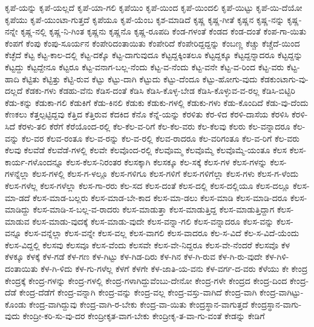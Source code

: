{ಕೃಪೆ-ಯನ್ನು
ಕೃಪೆ-ಯಲ್ಲದೆ
ಕೃಪೆ-ಯಾ-ಗಲಿ
ಕೃಪೆಯಿಂ
ಕೃಪೆ-ಯಿಂದ
ಕೃಪೆ-ಯಿಂದಲಿ
ಕೃಪೆ-ಯಿಟ್ಟು
ಕೃಪೆ-ಯಿ-ದೆಯೋ
ಕೃಪೆಯು
ಕೃಪೆ-ಯುಂಟಾ-ಗುತ್ತದೆ
ಕೃಪೆಯೂ
ಕೃಪೆ-ಯೆಂಬ
ಕೃಶ-ಮಾಡಿದೆ
ಕೃಷ್ಣ
ಕೃಷ್ಣ-ಗೀತೆ
ಕೃಷ್ಣನ
ಕೃಷ್ಣ-ನನ್ನು
ಕೃಷ್ಣ-ನನ್ನೇ
ಕೃಷ್ಣ-ನಲ್ಲಿ
ಕೃಷ್ಣ-ನಿ-ಗಿಂತ
ಕೃಷ್ಣನು
ಕೃಷ್ಣನೊ
ಕೃಷ್ಣ-ರೂಪದಿ
ಕೆಂಡ-ಗಳಂತೆ
ಕೆಂಡದ
ಕೆಂಡ-ದಂತೆ
ಕೆಂಪ-ಗಾ-ಯಿತು
ಕೆಂಪಗೆ
ಕೆಂಪು
ಕೆಂಪು-ಸೂರ್ಯನ
ಕೆಂಪೇರಿದಂತಾಯಿತು
ಕೆಂಪೇರಿದೆ
ಕೆಂಪೇರಿದ್ದದ್ದನ್ನು
ಕೆಂಬಣ್ಣ
ಕೆಚ್ಚು
ಕೆಚ್ಚೆದೆ-ಯಿಂದ
ಕೆಚ್ಛೆದೆ
ಕೆಟ್ಟ
ಕೆಟ್ಟ-ಕಾಲ-ದಲ್ಲಿ
ಕೆಟ್ಟ-ದಕ್ಕೊ
ಕೆಟ್ಟ-ದಾಗುವುದೂ
ಕೆಟ್ಟದ್ದಕ್ಕಿಂತಲೂ
ಕೆಟ್ಟದ್ದಕ್ಕೂ
ಕೆಟ್ಟದ್ದನ್ನಾದರೂ
ಕೆಟ್ಟದ್ದನ್ನು
ಕೆಟ್ಟದ್ದು
ಕೆಟ್ಟದ್ದೇನೂ
ಕೆಟ್ಟರೂ
ಕೆಟ್ಟ-ವನಾಗ-ಬಲ್ಲ-ನೆಂದು
ಕೆಟ್ಟ-ವ-ನೆಂದು
ಕೆಟ್ಟ-ವನೇ
ಕೆಟ್ಟ-ವ-ರಿಂದ
ಕೆಟ್ಟ-ವರು
ಕೆಟ್ಟ-ಹಾದಿ
ಕೆಟ್ಟಿತು
ಕೆಟ್ಟಿತ್ತು
ಕೆಟ್ಟಿ-ರುವ
ಕೆಟ್ಟು
ಕೆಟ್ಟು-ದಾಗಿ
ಕೆಟ್ಟುದು
ಕೆಟ್ಟು-ದೆಂದೂ
ಕೆಟ್ಟು-ಹೋಗು-ವುದು
ಕೆಡಕುಂಟಾಗು-ವು-ದಲ್ಲದೆ
ಕೆಡಕು-ಗಳು
ಕೆಡಹು-ವೆನು
ಕೆಡಿಸ-ದಂತೆ
ಕೆಡಿಸಿ
ಕೆಡಿಸಿ-ಕೊಳ್ಳ-ಬೇಡ
ಕೆಡಿಸಿ-ಕೊಳ್ಳುವ-ವ-ರಲ್ಲ
ಕೆಡಿಸಿ-ಬಿಟ್ಟಿರಿ
ಕೆಡು-ಕನ್ನು
ಕೆಡುಕಾ-ಗಲಿ
ಕೆಡುಕಿಗೆ
ಕೆಡು-ಕಿನಲಿ
ಕೆಡುಕು
ಕೆಡುಕು-ಗಳಲ್ಲಿ
ಕೆಡುಕು-ಗಳು
ಕೆಡು-ಕೊಂದಿದೆ
ಕೆಡು-ವು-ದೆಂದು
ಕೆಣಕಲು
ಕೆತ್ತಲ್ಪಟ್ಟಿದ್ದವು
ಕೆತ್ತಿದ
ಕೆತ್ತಿರುವ
ಕೆದಕಿದ
ಕೆನೊ
ಕೆನ್ನೆ-ಯನ್ನು
ಕೆರಳಿತು
ಕೆರ-ಳಿದ
ಕೆರಳಿ-ದಾಸೆಯ
ಕೆರಳಿಸಿ
ಕೆರಳಿ-ಸಿದೆ
ಕೆರಳು-ತಲಿ
ಕೆರೆಗೆ
ಕೆರೆಯೊಂದ-ರಲ್ಲಿ
ಕೆಲ-ಕೆಲ-ವ-ರಿಗೆ
ಕೆಲ-ಕೆಲ-ವರು
ಕೆಲ-ಕೆಲವು
ಕೆಲರು
ಕೆಲ-ವನ್ನಾದರೂ
ಕೆಲ-ವನ್ನು
ಕೆಲ-ವರ
ಕೆಲವ-ರಂತೂ
ಕೆಲ-ವ-ರನ್ನು
ಕೆಲ-ವ-ರಲ್ಲಿ
ಕೆಲವ-ರಾದರೂ
ಕೆಲ-ವರಿಗಂತೂ
ಕೆಲ-ವ-ರಿಗೆ
ಕೆಲ-ವರು
ಕೆಲವು
ಕೆಲವೆಡೆ
ಕೆಲವೆಡೆ-ಗಳಲ್ಲಿ
ಕೆಲವೇ
ಕೆಲವೊಂದ-ರಲ್ಲಿ
ಕೆಲವೊಮ್ಮ
ಕೆಲವೊಮ್ಮೆ
ಕೆಲವೊಮ್ಮೆ-ಯಂತೂ
ಕೆಲಸ
ಕೆಲಸ-ಕಾರ್ಯ-ಗಳೊಂದನ್ನೂ
ಕೆಲಸ-ಕೆಲಸ-ನಿರಂತರ
ಕೆಲಸಕ್ಕಾಗಿ
ಕೆಲಸಕ್ಕೂ
ಕೆಲ-ಸಕ್ಕೆ
ಕೆಲಸ-ಗಳ
ಕೆಲಸ-ಗಳನ್ನು
ಕೆಲಸ-ಗಳನ್ನೆಲ್ಲಾ
ಕೆಲಸ-ಗಳಲ್ಲಿ
ಕೆಲಸ-ಗ-ಳಲ್ಲೂ
ಕೆಲಸ-ಗಳಿಗೂ
ಕೆಲಸ-ಗಳಿಗೆ
ಕೆಲಸ-ಗಳಿಗೆಲ್ಲಾ
ಕೆಲಸ-ಗಳು
ಕೆಲಸ-ಗ-ಳೆಂದು
ಕೆಲಸ-ಗಳೆಲ್ಲ
ಕೆಲಸ-ಗಳೆಲ್ಲಾ
ಕೆಲಸ-ಗಾ-ರರು
ಕೆಲ-ಸದ
ಕೆಲಸ-ದಂತೆ
ಕೆಲಸ-ದಲ್ಲಿ
ಕೆಲಸ-ದಲ್ಲಿಯೂ
ಕೆಲಸ-ದಲ್ಲೂ
ಕೆಲಸ-ಮಾ-ಡದೆ
ಕೆಲಸ-ಮಾಡ-ಬಲ್ಲರು
ಕೆಲಸ-ಮಾಡ-ಬೇ-ಕಾದ
ಕೆಲಸ-ಮಾ-ಡಲು
ಕೆಲಸ-ಮಾಡಿ
ಕೆಲಸ-ಮಾಡಿ-ದರೂ
ಕೆಲಸ-ಮಾಡಿದ್ದು
ಕೆಲಸ-ಮಾಡಿ-ಸ-ಬಲ್ಲ-ವ-ರಾದರು
ಕೆಲಸ-ಮಾಡುತ್ತಾ
ಕೆಲಸ-ಮಾಡುತ್ತಿದ್ದ
ಕೆಲಸ-ಮಾಡುತ್ತಿದ್ದಾಗ
ಕೆಲಸ-ಮಾಡುವ
ಕೆಲಸ-ಮಾಡು-ವುದಕ್ಕೆ
ಕೆಲಸ-ಮಾಡು-ವುದೇ
ಕೆಲಸ-ವನ್ನಾ-ಗಲಿ
ಕೆಲಸ-ವನ್ನಾದರೂ
ಕೆಲಸ-ವನ್ನು
ಕೆಲಸ-ವನ್ನೂ
ಕೆಲಸ-ವನ್ನೆಲ್ಲಾ
ಕೆಲಸ-ವನ್ನೇ
ಕೆಲಸ-ವಲ್ಲ
ಕೆಲಸ-ವಾಗಲಿ
ಕೆಲಸ-ವಾದರೂ
ಕೆಲ-ಸ-ವಿದೆ
ಕೆಲ-ಸ-ವಿದೆ-ಯೆಂದು
ಕೆಲಸ-ವಿದ್ದಲ್ಲಿ
ಕೆಲಸವು
ಕೆಲಸವೂ
ಕೆಲಸ-ವೆಂದು
ಕೆಲಸವೇ
ಕೆಲಸ-ವೇ-ನಿದ್ದರೂ
ಕೆಲಸ-ವೇ-ನೆಂದರೆ
ಕೆಲಸವೊ
ಕೆಳ
ಕೆಳಕ್ಕೂ
ಕೆಳಕ್ಕೆ
ಕೆಳ-ಗಡೆ
ಕೆಳ-ಗಣ
ಕೆಳ-ಗಿಟ್ಟು
ಕೆಳ-ಗಿಡ-ದಿರು
ಕೆಳ-ಗಿನ
ಕೆಳ-ಗಿ-ರುವ
ಕೆಳ-ಗಿ-ರು-ವುದೇ
ಕೆಳ-ಗಿಳಿ-ದಂತಾಯಿತು
ಕೆಳ-ಗಿ-ಳಿದು
ಕೆಳ-ಗು-ಗಳೆಲ್ಲ
ಕೆಳಗೆ
ಕೆಳಗೇ
ಕೆಳ-ಜಾತಿ-ಯ-ವನು
ಕೆಳ-ವರ್ಗ-ದ-ವರು
ಕೆಳೆಯು
ಕೇ
ಕೇಂದ್ರ
ಕೇಂದ್ರಕ್ಕೆ
ಕೇಂದ್ರ-ಗಳನ್ನು
ಕೇಂದ್ರ-ಗಳಲ್ಲಿ
ಕೇಂದ್ರ-ಗಳಾಗಿದ್ದುವೆಂಬು-ದೇನೋ
ಕೇಂದ್ರ-ಗಳೇ
ಕೇಂದ್ರದ
ಕೇಂದ್ರ-ದಿಂದ
ಕೇಂದ್ರ-ದೆಡೆ
ಕೇಂದ್ರ-ದೆಡೆಗೆ
ಕೇಂದ್ರ-ವನ್ನಾಗಿ
ಕೇಂದ್ರ-ವನ್ನು
ಕೇಂದ್ರ-ವಲ್ಲ
ಕೇಂದ್ರ-ವಸ್ತು-ವಾಗಿದೆ
ಕೇಂದ್ರ-ವಾಗಿ
ಕೇಂದ್ರ-ವಾಗಿಟ್ಟು-ಕೊಂಡು
ಕೇಂದ್ರ-ವಾಗಿದ್ದುವು
ಕೇಂದ್ರ-ವಾಗಿ-ರ-ಬೇಕು
ಕೇಂದ್ರ-ವಾ-ಯಿತು
ಕೇಂದ್ರಸ್ಥಾನ-ವಾಗುತ್ತದೆ
ಕೇಂದ್ರಸ್ಥಾನ-ವಾಗು-ವುದು
ಕೇಂದ್ರೀ-ಕರಿ-ಸು-ವು-ದರ
ಕೇಂದ್ರೀಕೃತ-ವಾಗ-ಬೇಕು
ಕೇಂದ್ರೀಕೃ-ತ-ವಾ-ಗು-ವಂತೆ
ಕೇಡನ್ನು
ಕೇಡಿಗೆ
}
